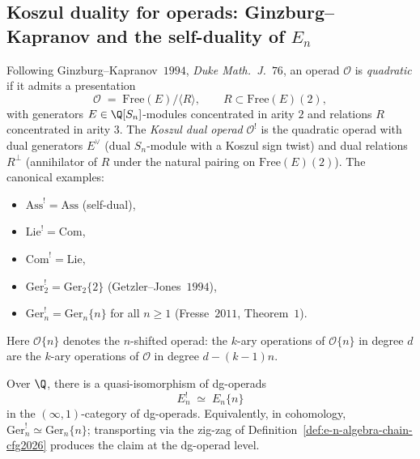 \subsection*{Koszul duality for operads: Ginzburg--Kapranov and the self-duality of $E_n$}

\begin{definition}
\label{def:quadratic-operad-koszul-dual-cfg2026}
\ClaimStatusDefinitional
Following Ginzburg--Kapranov~$1994$, \textit{Duke Math.~J.}~$76$, an
operad $\mathcal{O}$ is \emph{quadratic} if it admits a presentation
\[
 \mathcal{O} \;=\; \mathrm{Free}(E) / \langle R \rangle, \qquad R \subset \mathrm{Free}(E)(2),
\]
with generators $E \in \Q[S_n]$-modules concentrated in arity $2$ and
relations $R$ concentrated in arity $3$. The \emph{Koszul dual operad}
$\mathcal{O}^{!}$ is the quadratic operad with dual generators
$E^\vee$ (dual $S_n$-module with a Koszul sign twist) and dual
relations $R^\perp$ (annihilator of $R$ under the natural pairing on
$\mathrm{Free}(E)(2)$). The canonical examples:
\begin{itemize}
  \item $\mathrm{Ass}^{!} = \mathrm{Ass}$ (self-dual),
  \item $\mathrm{Lie}^{!} = \mathrm{Com}$,
  \item $\mathrm{Com}^{!} = \mathrm{Lie}$,
  \item $\mathrm{Ger}_2^{!} = \mathrm{Ger}_2\{2\}$ (Getzler--Jones~$1994$),
  \item $\mathrm{Ger}_n^{!} = \mathrm{Ger}_n\{n\}$ for all $n \geq 1$
        (Fresse~$2011$, Theorem~$1$).
\end{itemize}
Here $\mathcal{O}\{n\}$ denotes the $n$-shifted operad: the $k$-ary
operations of $\mathcal{O}\{n\}$ in degree $d$ are the $k$-ary
operations of $\mathcal{O}$ in degree $d - (k-1) n$.
\end{definition}

\begin{theorem}
\label{thm:en-self-dual-shift-cfg2026}
\ClaimStatusProvedHere
Over $\Q$, there is a quasi-isomorphism of dg-operads
\[
 E_n^{!} \;\simeq\; E_n\{n\}
\]
in the $(\infty,1)$-category of dg-operads. Equivalently, in
cohomology, $\mathrm{Ger}_n^{!} \simeq \mathrm{Ger}_n\{n\}$; transporting
via the zig-zag of Definition~\ref{def:e-n-algebra-chain-cfg2026}
produces the claim at the dg-operad level.
\end{theorem}


